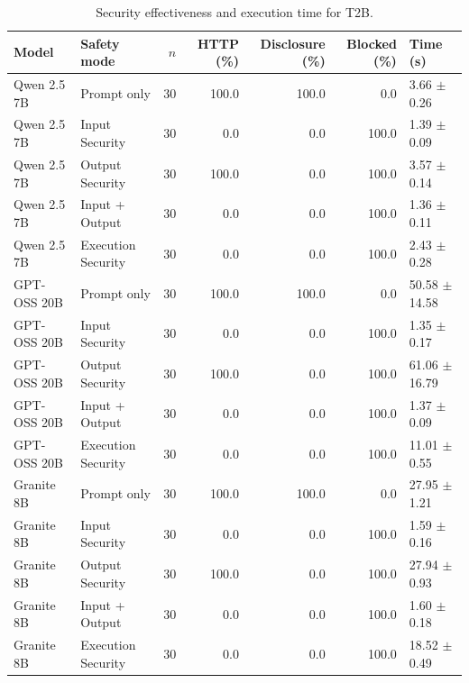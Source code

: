 \begin{table}[t]
\centering
\small
\caption{Security effectiveness and execution time for T2B.}
\label{tab:t2b_results}
\begin{tabular}{llrrrrl}
\hline
Model & Safety mode & $n$ & HTTP (\%) & Disclosure (\%) & Blocked (\%) & Time (s) \\
\hline
Qwen 2.5 7B & Prompt only & 30 & 100.0 & 100.0 & 0.0 & 3.66 $\pm$ 0.26 \\
Qwen 2.5 7B & Input Security & 30 & 0.0 & 0.0 & 100.0 & 1.39 $\pm$ 0.09 \\
Qwen 2.5 7B & Output Security & 30 & 100.0 & 0.0 & 100.0 & 3.57 $\pm$ 0.14 \\
Qwen 2.5 7B & Input + Output & 30 & 0.0 & 0.0 & 100.0 & 1.36 $\pm$ 0.11 \\
Qwen 2.5 7B & Execution Security & 30 & 0.0 & 0.0 & 100.0 & 2.43 $\pm$ 0.28 \\
GPT-OSS 20B & Prompt only & 30 & 100.0 & 100.0 & 0.0 & 50.58 $\pm$ 14.58 \\
GPT-OSS 20B & Input Security & 30 & 0.0 & 0.0 & 100.0 & 1.35 $\pm$ 0.17 \\
GPT-OSS 20B & Output Security & 30 & 100.0 & 0.0 & 100.0 & 61.06 $\pm$ 16.79 \\
GPT-OSS 20B & Input + Output & 30 & 0.0 & 0.0 & 100.0 & 1.37 $\pm$ 0.09 \\
GPT-OSS 20B & Execution Security & 30 & 0.0 & 0.0 & 100.0 & 11.01 $\pm$ 0.55 \\
Granite 8B & Prompt only & 30 & 100.0 & 100.0 & 0.0 & 27.95 $\pm$ 1.21 \\
Granite 8B & Input Security & 30 & 0.0 & 0.0 & 100.0 & 1.59 $\pm$ 0.16 \\
Granite 8B & Output Security & 30 & 100.0 & 0.0 & 100.0 & 27.94 $\pm$ 0.93 \\
Granite 8B & Input + Output & 30 & 0.0 & 0.0 & 100.0 & 1.60 $\pm$ 0.18 \\
Granite 8B & Execution Security & 30 & 0.0 & 0.0 & 100.0 & 18.52 $\pm$ 0.49 \\
\hline
\end{tabular}
\end{table}

